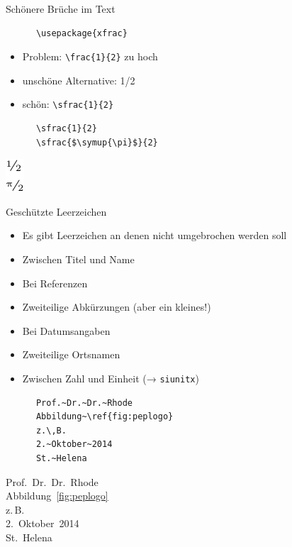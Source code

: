 \begin{frame}[fragile]{Schönere Brüche im Text}
  \begin{Packages}
    \begin{lstlisting}
      \usepackage{xfrac}
    \end{lstlisting}
  \end{Packages}
  \begin{itemize}
    \item Problem: \lstinline+\frac{1}{2}+ zu hoch
    \item unschöne Alternative: 1/2
    \item schön: \lstinline+\sfrac{1}{2}+
  \end{itemize}
  \begin{CodeExample}{0.5}
    \begin{lstlisting}
      \sfrac{1}{2}
      \sfrac{$\symup{\pi}$}{2}
    \end{lstlisting}
  \CodeResult
    \includegraphics[scale=0.8]{figures/xfrac.pdf}
  \end{CodeExample}
\end{frame}

\begin{frame}[fragile]{Geschützte Leerzeichen}
  \begin{itemize}
    \item Es gibt Leerzeichen an denen nicht umgebrochen werden soll
    \item Zwischen Titel und Name
    \item Bei Referenzen
    \item Zweiteilige Abkürzungen (aber ein kleines!)
    \item Bei Datumsangaben
    \item Zweiteilige Ortsnamen
    \item Zwischen Zahl und Einheit (→ \texttt{siunitx})
  \end{itemize}
  \begin{CodeExample}{0.5}
    \begin{lstlisting}
      Prof.~Dr.~Dr.~Rhode
      Abbildung~\ref{fig:peplogo}
      z.\,B.
      2.~Oktober~2014
      St.~Helena
    \end{lstlisting}
    \CodeResult
      Prof.~Dr.~Dr.~Rhode \\
      Abbildung~\ref{fig:peplogo} \\
      z.\,B. \\
      2.~Oktober~2014 \\
      St.~Helena
  \end{CodeExample}
\end{frame}

